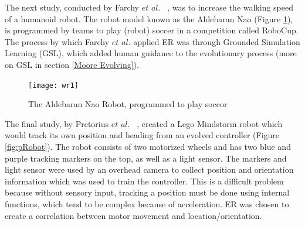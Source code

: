 \documentclass{sig-alternate}
\begin{document}
	
	The next study, conducted by Farchy $et$ $al.$ ~\cite{Farchy:2013:HRL:2484920.2484930}, was to increase the walking speed of a humanoid robot. The robot model known as the Aldebaran Nao (Figure \ref{fig:wRobot}), is programmed by teams to play (robot) soccer in a competition called RoboCup. The process by which  Farchy $et$ $al.$ applied ER was through Grounded Simulation Learning (GSL), which added human guidance to the evolutionary process (more on GSL in section \ref{Moore Evolving}). 
	
\begin{figure}%
\begin{center}
  \texttt{[image: wr1]}
\end{center}
\caption{The Aldebaran Nao Robot, programmed to play soccor}
\label{fig:wRobot}
\end{figure}

	The final study, by Pretorius $et$ $al.$ ~\cite{Pretorius:2009:TAN:1632149.1632171}, created a Lego Mindstorm robot which would track its own position and heading from an evolved controller (Figure \ref{fig:pRobot}). The robot consists of two motorized wheels and has two blue and purple tracking markers on the top, as well as a light sensor. The markers and light sensor were used by an overhead camera to collect position and orientation information which was used to train the controller. This is a difficult problem because without sensory input, tracking a position must be done using internal functions, which tend to be complex because of acceleration. ER was chosen to create a correlation between motor movement and location/orientation. 
\end{document}
